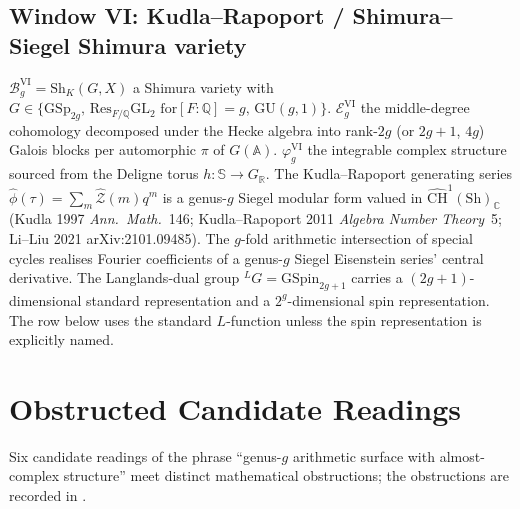\subsection{Window VI: Kudla--Rapoport / Shimura--Siegel Shimura variety}
\label{v4-arith:ag:w6-shimura}

\(\mathcal{B}_g^{\mathrm{VI}}=\mathrm{Sh}_K(G,X)\) a Shimura variety with
\(G\in\{\mathrm{GSp}_{2g},\,\mathrm{Res}_{F/\mathbb{Q}}\mathrm{GL}_2\text{ for
}[F:\mathbb{Q}]=g,\,\mathrm{GU}(g,1)\}\). \(\mathcal{E}_g^{\mathrm{VI}}\) the
middle-degree cohomology decomposed under the Hecke algebra into rank-\(2g\)
(or \(2g+1\), \(4g\)) Galois blocks per automorphic \(\pi\) of \(G(\mathbb{A})\).
\(\varphi_g^{\mathrm{VI}}\) the integrable complex structure sourced from the
Deligne torus \(h:\mathbb{S}\to G_{\mathbb{R}}\). The Kudla--Rapoport
generating series \(\widehat{\phi}(\tau)=\sum_m\widehat{\mathcal{Z}}(m)q^m\)
is a genus-\(g\) Siegel modular form valued in \(\widehat{\mathrm{CH}}^1(\mathrm{Sh})_{\mathbb{C}}\)
(Kudla 1997 \emph{Ann.~Math.}~146; Kudla--Rapoport 2011
\emph{Algebra Number Theory}~5; Li--Liu 2021 arXiv:2101.09485). The \(g\)-fold arithmetic
intersection of special cycles realises Fourier coefficients of a
genus-\(g\) Siegel Eisenstein series' central derivative. The Langlands-dual
group \({}^LG=\mathrm{GSpin}_{2g+1}\) carries a \((2g+1)\)-dimensional
standard representation and a \(2^{g}\)-dimensional spin
representation. The row below uses the standard \(L\)-function unless
the spin representation is explicitly named.

\section{Obstructed Candidate Readings}
\label{v4-arith:ag:falsified}

Six candidate readings of the phrase ``genus-\(g\) arithmetic surface
with almost-complex structure'' meet distinct mathematical obstructions;
the obstructions are recorded in .

